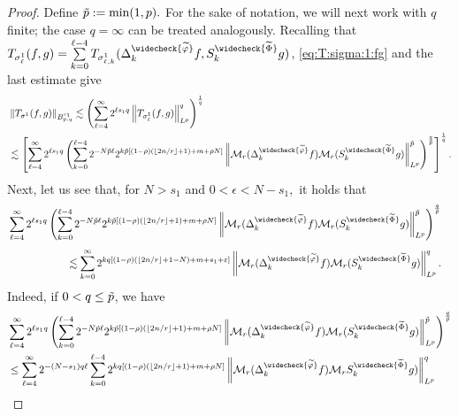 \begin{proof}
  Define $\tilde{p}:=\min(1,p).$  For the sake of notation, we will next work with $q$ finite; the case $q=\infty$ can be treated analogously.
  Recalling that $T_{\sigma^1_\ell}(f,g)= \sum\limits_{k=0}^{\ell -4} T_{\sigma^1_{\ell,k}}(\Delta^{\widecheck{\widetilde{\f}}}_k f,S^{\widecheck{\widetilde{\Phi}}}_k g)$,  \eqref{eq:T:sigma:1:fg} and the last  estimate give
\begin{align}
& \norm{T_{\sigma^1}(f,g)}{\ibes{p}{s_1}{q}}  \lesssim  \left( \sum\limits_{\ell=4}^\infty 2^{\ell s_1q} \norm{T_{\sigma^1_\ell}(f,g)}{L^p}^q \right)^\frac{1}{q}\label{eq:T1:fg:Fqp}\\
& \lesssim  \left[  \sum\limits_{\ell=4}^\infty 2^{\ell s_1 q} \left(  \sum\limits_{k=0}^{\ell -4} 2^{- N\pst \ell} 2^{k\pst [(1-\rho)( \lfloor{2n/r}\rfloor + 1)+m+\rho N]}   \norm{\mathcal{M}_r(\Delta^{\widecheck{\widetilde{\f}}}_kf)\mathcal{M}_r(S^{\widecheck{\widetilde{\Phi}}}_k g)}{L^p}^{\pst}\right)^\frac{q}{\pst} \right]^\frac{1}{q}. \nonumber
\end{align}
Next, let us see that, for  $N>s_1$ and $0<\epsilon< N-s_1,$  it holds that
\begin{align}\label{eq:moving:the:sums}
& \sum\limits_{\ell=4}^\infty 2^{\ell  s_1 q} \left(  \sum\limits_{k=0}^{\ell -4} 2^{- N \pst\ell} 2^{k \pst[(1-\rho)( \lfloor{2n/r}\rfloor + 1)+m+\rho N]}    \norm{\mathcal{M}_r(\Delta^{\widecheck{\widetilde{\f}}}_k f)\mathcal{M}_r(S^{\widecheck{\widetilde{\Phi}}}_kg)}{L^p}^{\pst}\right)^{\frac{q}{\pst}}  
\end{align}
\begin{align*}
&\hspace{2cm}\lesssim \sum\limits_{k=0}^\infty 2^{k q[ (1-\rho)( \lfloor{2n/r}\rfloor + 1-N) + m+ s_1+\eps] }   \norm{\mathcal{M}_r(\Delta^{\widecheck{\widetilde{\f}}}_k f)\mathcal{M}_r(S^{\widecheck{\widetilde{\Phi}}}_k g)}{L^p}^q.
\end{align*}
 Indeed, if $0 < q \leq \tilde{p}$, we have
\begin{align*}
& \sum\limits_{\ell=4}^\infty  2^{\ell  s_1 q} \left(  \sum\limits_{k=0}^{\ell -4} 2^{- N \pst \ell} 2^{k \pst [(1-\rho)( \lfloor{2n/r}\rfloor + 1)+m+\rho N]}   \norm{\mathcal{M}_r(\Delta^{\widecheck{\widetilde{\f}}}_k f)\mathcal{M}_r(S^{\widecheck{\widetilde{\Phi}}}_k g)}{L^p}^{\pst}\right)^\frac{q}{\pst} \\
& \leq \sum\limits_{\ell=4}^\infty 2^{-(N-s_1) q \ell} \sum\limits_{k=0}^{\ell -4}  2^{k q [(1-\rho)( \lfloor{2n/r}\rfloor + 1) + m+\rho N]}   \norm{\mathcal{M}_r(\Delta^{\widecheck{\widetilde{\f}}}_k f)\mathcal{M}_rS^{\widecheck{\widetilde{\Phi}}}_k g)}{L^p}^q\\

\end{align*}
\end{proof}

